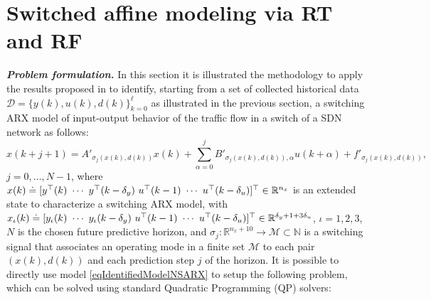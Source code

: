 \section{Switched affine modeling via RT and RF}\label{secSwitchedModeling}

\textbf{\emph{Problem formulation.}} In this section it is illustrated the methodology to apply the results proposed in \cite{SmarraADHS2018,smarraNAHS2020} to identify, starting from a set of collected historical data $ \mathcal{D}=\{y(k),u(k),d(k)\}_{k = 0}^{\ell} $ as illustrated in the previous section, a switching ARX model of input-output behavior of the traffic flow in a switch of a SDN network as follows:
\small
\begin{equation}\label{eqIdentifiedModelNSARX}
x(k+j+1) =	A'_{\sigma_j(x(k),d(k))} x(k) + \sum_{\alpha = 0}^{j}B'_{\sigma_{j}(x(k),d(k)),\alpha} u(k+\alpha) + f'_{\sigma_j(x(k),d(k))},
\end{equation}
\normalsize
\noindent $j = 0,\ldots, N-1$, where $x(k) \doteq [y^\top(k)\ \cdots\ y^\top(k-\delta_y)\ u^\top(k-1)\ \cdots\ u^\top(k-\delta_u)]^\top\in\Real^{n_x}$ is an extended state to characterize a switching ARX model, with $x_\iota(k) \doteq [y_\iota(k)\ \cdots\ y_\iota(k-\delta_y)\ u^\top(k-1)\ \cdots\ u^\top(k-\delta_u)]^\top\in\Real^{\delta_y+1+3\delta_u}$, $\iota = 1,2,3$, $N$ is the chosen future predictive horizon, and  $\sigma_j : \mathbb{R}^{n_x+10} \to \mathcal M \subset \mathbb{N}$ is a switching signal that associates an operating mode in a finite set $\mathcal M$ to each pair $(x(k),d(k))$ and each prediction step $j$ of the horizon.
It is possible to directly use model \eqref{eqIdentifiedModelNSARX} to setup the following problem, which can be solved using standard Quadratic Programming (QP) solvers:\\
